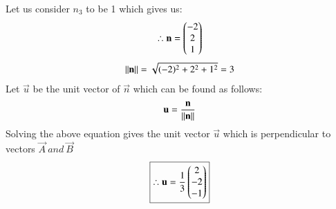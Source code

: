 Let us consider $n_{3}$ to be 1 which gives us:
\begin{align}
\therefore \mathbf{n} = \begin{pmatrix}-2\\2\\1\\\end{pmatrix}
\end{align}
\begin{align}      
\left\lVert{\mathbf{n}}\right\rVert=\sqrt{(-2)^2+2^2+1^2}=3
\end{align}
Let $\vec{u}$ be the unit vector of $\vec{n}$ which can be found as follows:
\begin{align}      
\mathbf{u}=\frac{{\mathbf{n}}}{\left\lVert{\mathbf{n}}\right\rVert}
\end{align}
Solving the above equation gives the unit vector $\vec{u}$ which is perpendicular to vectors $\vec{A} \ and \ \vec{B}$
\begin{align}
\boxed{\therefore \mathbf{u} = \frac{1}{3} \begin{pmatrix}2\\-2\\-1\\\end{pmatrix}}
\end{align}

